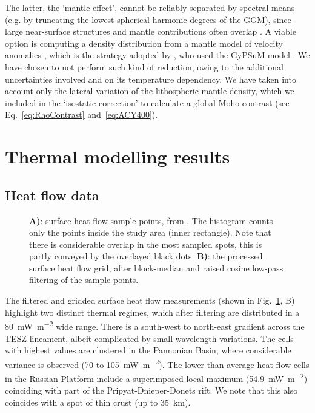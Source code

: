 {The latter, the `mantle effect', cannot be reliably separated by spectral means (e.g. by truncating the lowest spherical harmonic degrees of the GGM), since large near-surface structures and mantle contributions often overlap \parencite{Kaban2004}.
A viable option is computing a density distribution from a mantle model of velocity anomalies \parencite[e.g. ][]{Kuhn2005}, which is the strategy adopted by \textcite{Reguzzoni2015}, who used the GyPSuM model \parencite{Simmons2010}.
We have chosen to not perform such kind of reduction, owing to the additional uncertainties involved and on its temperature dependency.
We have taken into account only the lateral variation of the lithospheric mantle density, which we included in the `isostatic correction' to calculate a global Moho contrast (see Eq.~\ref{eq:RhoContrast} and~\ref{eq:ACY400}).

\section{Thermal modelling results}
\label{s:Appl:DiscTherm}

\subsection{Heat flow data}
\label{ss:Appl:DiscTherm:HF}

\begin{figure}
	\begin{adjustbox}{center}
	\end{adjustbox}
	\caption{\textbf{A)}: surface heat flow sample points, from \textcite{globalHF}. The histogram counts only the points inside the study area (inner rectangle). Note that there is considerable overlap in the most sampled spots, this is partly conveyed by the overlayed black dots. \textbf{B)}: the processed surface heat flow grid, after block-median and raised cosine low-pass filtering of the sample points.}
	\label{fig:HFdata}
\end{figure}

The filtered and gridded surface heat flow measurements (shown in Fig.~\ref{fig:HFdata}, B) highlight two distinct thermal regimes, which after filtering are distributed in a 80~\si{\milli \watt \per \square \metre} wide range.
There is a south-west to north-east gradient across the TESZ lineament, albeit complicated by small wavelength variations.
The cells with highest values are clustered in the Pannonian Basin, where considerable variance is observed (70 to 105~\si{\milli \watt \per \square \metre}).
The lower-than-average heat flow cells in the Russian Platform include a superimposed local maximum (54.9~\si{\milli \watt \per \square \metre}) coinciding with part of the Pripyat-Dnieper-Donets rift.
We note that this also coincides with a spot of thin crust (up to 35~km).

}
